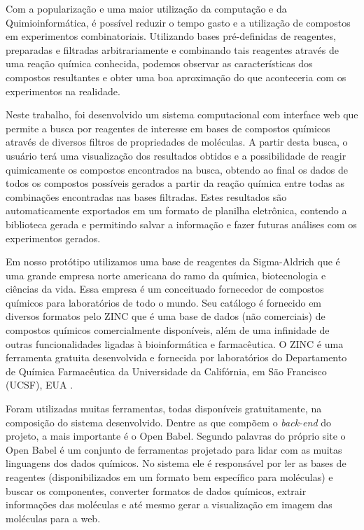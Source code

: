 \documentclass{abnt}
\begin{document}
Com a popularização e uma maior utilização da computação e da Quimioinformática,
é possível reduzir o tempo gasto e a utilização de compostos em experimentos combinatoriais.
Utilizando bases pré-definidas de reagentes, preparadas e filtradas arbitrariamente
e combinando tais reagentes através de uma reação química conhecida, podemos observar
as características dos compostos resultantes e obter uma boa aproximação do que
aconteceria com os experimentos na realidade.

Neste trabalho, foi desenvolvido um sistema computacional com interface web que
permite a busca por reagentes de interesse em bases de compostos químicos através
de diversos filtros de propriedades de moléculas. A partir desta busca, o usuário
terá uma visualização dos resultados obtidos e a possibilidade de reagir quimicamente
os compostos encontrados na busca, obtendo ao final os dados de todos os compostos
possíveis gerados a partir da reação química entre todas as combinações encontradas
nas bases filtradas. Estes resultados são automaticamente exportados em um formato
de planilha eletrônica, contendo a biblioteca gerada e permitindo salvar a informação
e fazer futuras análises com os experimentos gerados.

Em nosso protótipo utilizamos uma base de reagentes da Sigma-Aldrich\cite{SIGMA} que é uma grande
empresa norte americana do ramo da química, biotecnologia e ciências da vida. Essa
empresa é um conceituado fornecedor de compostos químicos para laboratórios de todo
o mundo. Seu catálogo é fornecido em diversos formatos pelo ZINC\cite{ZINC} que é uma base de
dados (não comerciais) de compostos químicos comercialmente disponíveis, além de
uma infinidade de outras funcionalidades ligadas à bioinformática e farmacêutica.
O ZINC é uma ferramenta gratuita desenvolvida e fornecida por laboratórios do Departamento
de Química Farmacêutica da Universidade da Califórnia, em São Francisco (UCSF),
EUA \cite{UCSFCHEM}.

Foram utilizadas muitas ferramentas, todas disponíveis gratuitamente, na composição
do sistema desenvolvido. Dentre as que compõem o \textit{back-end} do projeto, a mais importante
é o Open Babel\cite{OPEN_BABEL}. Segundo palavras do próprio site o Open Babel é um conjunto de ferramentas
projetado para lidar com as muitas linguagens dos dados químicos. No sistema ele
é responsável por ler as bases de reagentes (disponibilizados em um formato bem
específico para moléculas) e buscar os componentes, converter formatos de dados
químicos, extrair informações das moléculas e até mesmo gerar a visualização em
imagem das moléculas para a web.
\end{document}
